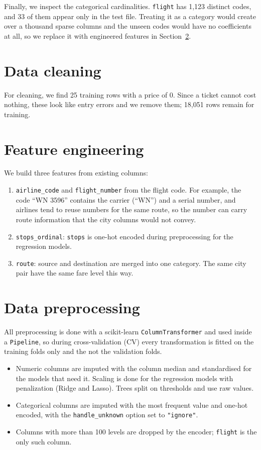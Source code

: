 \documentclass[11pt]{article}
\begin{document}
Finally, we inspect the categorical cardinalities. \texttt{flight} has 1,123 distinct codes, and 33 of them appear only in the test file. Treating it as a category would create over a thousand sparse columns and the unseen codes would have no coefficients at all, so we replace it with engineered features in Section~\ref{sec:features}.

\section{Data cleaning}

For cleaning, we find 25 training rows with a price of 0. Since a ticket cannot cost nothing, these look like entry errors and we remove them; 18,051 rows remain for training. 

\section{Feature engineering}\label{sec:features}

We build three features from existing columns:

\begin{enumerate}
  \item \texttt{airline\_code} and \texttt{flight\_number} from the flight code. For example, the code ``WN 3596'' contains the carrier (``WN'') and a serial number, and airlines tend to reuse numbers for the same route, so the number can carry route information that the city columns would not convey.
  \item \texttt{stops\_ordinal}: \texttt{stops} is one-hot encoded during preprocessing for the regression models.
  \item \texttt{route}: source and destination are merged into one category. The same city pair have the same fare level this way.
\end{enumerate}

\section{Data preprocessing}

All preprocessing is done with a scikit-learn \texttt{ColumnTransformer} and used inside a \texttt{Pipeline}, so during cross-validation (CV) every transformation is fitted on the training folds only and the not the validation folds.

\begin{itemize}
  \item Numeric columns are imputed with the column median and standardised for the models that need it. Scaling is done for the regression models with penalization (Ridge and Lasso). Trees split on thresholds and use raw values.
  \item Categorical columns are imputed with the most frequent value and one-hot encoded, with the \texttt{handle\_unknown} option set to \texttt{"ignore"}.
  \item Columns with more than 100 levels are dropped by the encoder; \texttt{flight} is the only such column.
\end{itemize}
\end{document}
